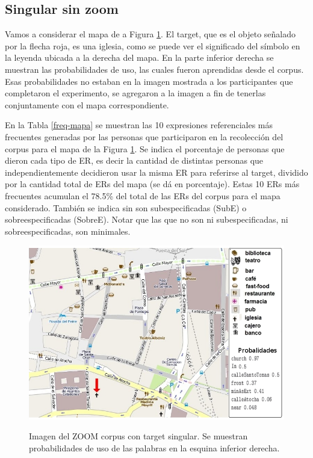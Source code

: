 \subsection{Singular sin zoom}
\label{sec:sinzoom}

Vamos a considerar el mapa de a Figura \ref{mapa-zoom1}. El target, que es el objeto se\~nalado por la flecha roja, es una iglesia, como se puede ver el significado del s\'imbolo en la leyenda ubicada a la derecha del mapa. En la parte inferior derecha se muestran las probabilidades de uso, las cuales fueron aprendidas desde el corpus. Esas probabilidades no estaban en la imagen mostrada a los participantes que completaron el experimento, se agregaron a la imagen a fin de tenerlas conjuntamente con el mapa correspondiente.

En la Tabla \ref{freq-mapa} se muestran las 10 expresiones referenciales m\'as frecuentes generadas por las personas que participaron 
en la recolecci\'on del corpus para el mapa de la Figura \ref{mapa-zoom1}. Se indica el porcentaje de personas que dieron cada tipo de ER, es decir la cantidad de distintas personas que independientemente decidieron usar la misma ER para referirse al target, dividido por la cantidad total de ERs del mapa (se d\'a en porcentaje). Estas 10 ERs m\'as frecuentes acumulan el 78.5\% del total de las ERs del corpus para el mapa considerado. Tambi\'en se indica sin son subespecificadas (SubE) o sobreespecificadas (SobreE). Notar que las que no son ni subespecificadas, ni sobreespecificadas, son minimales.\\


\begin{figure}
\centering
\includegraphics[width=150mm]{images/corpus/mapa6-prob.png}\\[0pt]
\caption{Imagen del ZOOM corpus con target singular. Se muestran probabilidades de uso de las palabras en la esquina inferior derecha.}
\label{mapa-zoom1}
\end{figure}


